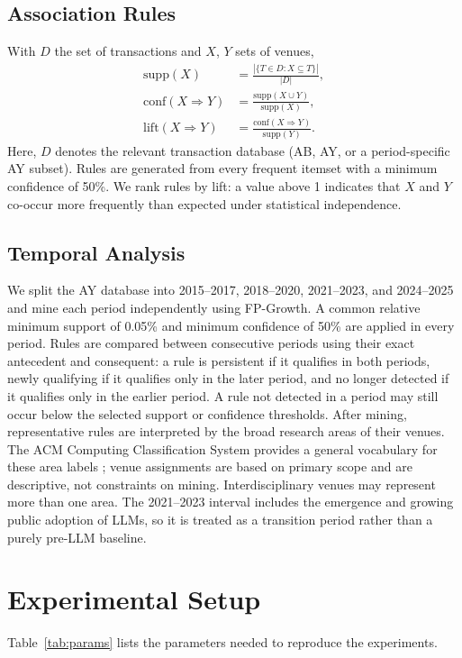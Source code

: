 ﻿\documentclass[conference]{IEEEtran}
\begin{document}
\subsection{Association Rules}
With $D$ the set of transactions and $X$, $Y$ sets of venues,
\begin{align}
\mathrm{supp}(X) &= \frac{|\{T\in D : X\subseteq T\}|}{|D|},\\
\mathrm{conf}(X\Rightarrow Y) &= \frac{\mathrm{supp}(X\cup Y)}{\mathrm{supp}(X)},\\
\mathrm{lift}(X\Rightarrow Y) &= \frac{\mathrm{conf}(X\Rightarrow Y)}{\mathrm{supp}(Y)}.
\end{align}
Here, $D$ denotes the relevant transaction database (AB, AY, or a period-specific AY subset). Rules are generated from every frequent itemset with a minimum confidence of 50\%. We rank rules by lift: a value above 1 indicates that $X$ and $Y$ co-occur more frequently than expected under statistical independence.

\subsection{Temporal Analysis}
We split the AY database into 2015--2017, 2018--2020, 2021--2023, and 2024--2025 and mine each period independently using FP-Growth. A common relative minimum support of 0.05\% and minimum confidence of 50\% are applied in every period. Rules are compared between consecutive periods using their exact antecedent and consequent: a rule is persistent if it qualifies in both periods, newly qualifying if it qualifies only in the later period, and no longer detected if it qualifies only in the earlier period. A rule not detected in a period may still occur below the selected support or confidence thresholds. After mining, representative rules are interpreted by the broad research areas of their venues. The ACM Computing Classification System provides a general vocabulary for these area labels \cite{acmccs}; venue assignments are based on primary scope and are descriptive, not constraints on mining. Interdisciplinary venues may represent more than one area. The 2021--2023 interval includes the emergence and growing public adoption of LLMs, so it is treated as a transition period rather than a purely pre-LLM baseline.

\section{Experimental Setup}
Table~\ref{tab:params} lists the parameters needed to reproduce the experiments.
\end{document}

